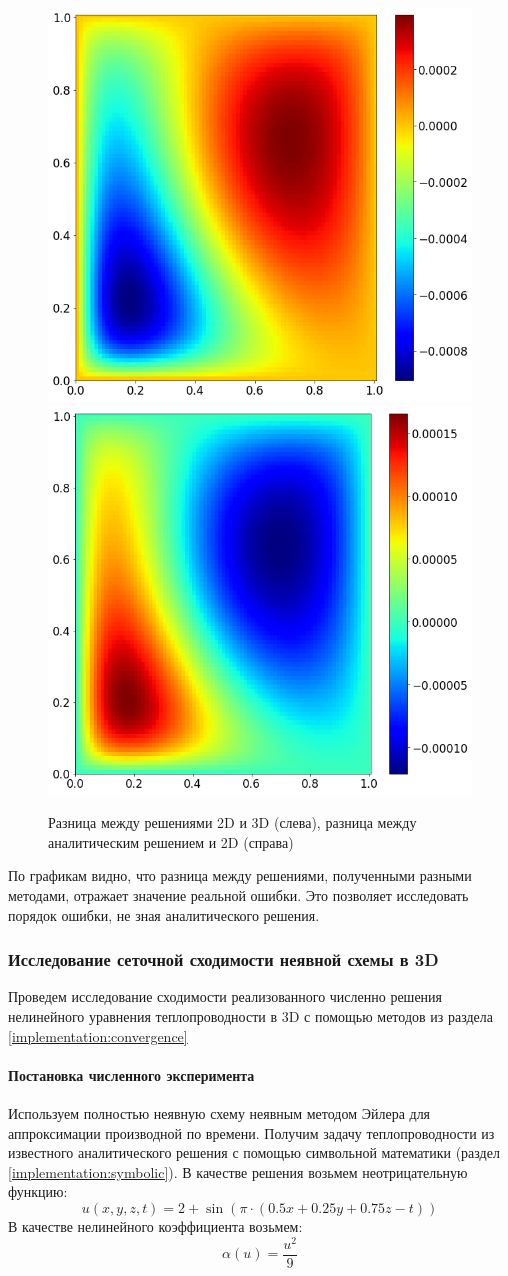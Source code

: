 \begin{figure}[H]
\centering
\includegraphics[width=.5\textwidth]{compare_2d_3d/difference.png}\hfill
\includegraphics[width=.5\textwidth]{compare_2d_3d/error.png}
\caption{Разница между решениями 2D и 3D (слева), разница между аналитическим решением и 2D (справа)}
\label{fig:difference}
\end{figure}
По графикам видно, что разница между решениями, полученными разными методами, отражает значение реальной ошибки. Это позволяет исследовать порядок ошибки, не зная аналитического решения.

\subsubsection{Исследование сеточной сходимости неявной схемы в 3D \label{heat:convergence}}
Проведем исследование сходимости реализованного численно решения нелинейного уравнения теплопроводности в 3D с помощью методов из раздела \ref{implementation:convergence}
\paragraph{Постановка численного эксперимента}
Используем полностью неявную схему неявным методом Эйлера для аппроксимации производной по времени. Получим задачу теплопроводности из известного аналитического решения с помощью символьной математики (раздел \ref{implementation:symbolic}).
В качестве решения возьмем неотрицательную функцию:
\begin{equation}
u(x, y, z, t) = 2 + \sin \left(\pi \cdot \left( 0.5x + 0.25y + 0.75z - t\right) \right)
\end{equation}
В качестве нелинейного коэффициента возьмем:
\begin{equation}
\alpha(u) = \frac{u^2}{9}
\end{equation}

